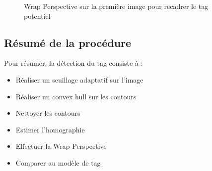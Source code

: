         \begin{figure}[h]
            \centering
            \hspace{.02\textwidth}
            \caption{Wrap Perspective sur la première image pour recadrer le tag potentiel}
        \end{figure}
            

        \subsection{Résumé de la procédure}

        Pour résumer, la détection du tag consiste à :

        \begin{itemize}
            \item Réaliser un seuillage adaptatif sur l'image
            \item Réaliser un convex hull sur les contours
            \item Nettoyer les contours
            \item Estimer l'homographie
            \item Effectuer la Wrap Perspective
            \item Comparer au modèle de tag
        \end{itemize}

